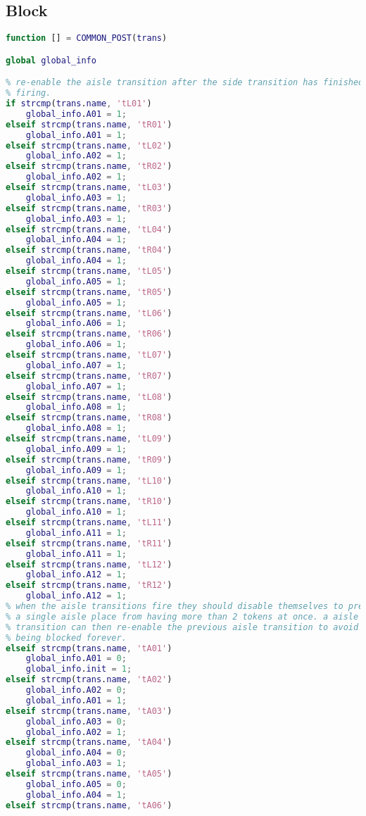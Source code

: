 \subsection{Block}
\begin{lstlisting}[language=MATLAB, caption=COMMON\_POST.m]
function [] = COMMON_POST(trans)

global global_info

% re-enable the aisle transition after the side transition has finished
% firing. 
if strcmp(trans.name, 'tL01')
    global_info.A01 = 1;
elseif strcmp(trans.name, 'tR01')
    global_info.A01 = 1;
elseif strcmp(trans.name, 'tL02')
    global_info.A02 = 1;
elseif strcmp(trans.name, 'tR02')
    global_info.A02 = 1;
elseif strcmp(trans.name, 'tL03')
    global_info.A03 = 1;
elseif strcmp(trans.name, 'tR03')
    global_info.A03 = 1;
elseif strcmp(trans.name, 'tL04')
    global_info.A04 = 1;
elseif strcmp(trans.name, 'tR04')
    global_info.A04 = 1;
elseif strcmp(trans.name, 'tL05')
    global_info.A05 = 1;
elseif strcmp(trans.name, 'tR05')
    global_info.A05 = 1;
elseif strcmp(trans.name, 'tL06')
    global_info.A06 = 1;
elseif strcmp(trans.name, 'tR06')
    global_info.A06 = 1;
elseif strcmp(trans.name, 'tL07')
    global_info.A07 = 1;
elseif strcmp(trans.name, 'tR07')
    global_info.A07 = 1;
elseif strcmp(trans.name, 'tL08')
    global_info.A08 = 1;
elseif strcmp(trans.name, 'tR08')
    global_info.A08 = 1;
elseif strcmp(trans.name, 'tL09')
    global_info.A09 = 1;
elseif strcmp(trans.name, 'tR09')
    global_info.A09 = 1;
elseif strcmp(trans.name, 'tL10')
    global_info.A10 = 1;
elseif strcmp(trans.name, 'tR10')
    global_info.A10 = 1;
elseif strcmp(trans.name, 'tL11')
    global_info.A11 = 1;
elseif strcmp(trans.name, 'tR11')
    global_info.A11 = 1;
elseif strcmp(trans.name, 'tL12')
    global_info.A12 = 1;
elseif strcmp(trans.name, 'tR12')
    global_info.A12 = 1;
% when the aisle transitions fire they should disable themselves to prevent
% a single aisle place from having more than 2 tokens at once. a aisle
% transition can then re-enable the previous aisle transition to avoid it
% being blocked forever.
elseif strcmp(trans.name, 'tA01')
    global_info.A01 = 0;
    global_info.init = 1;
elseif strcmp(trans.name, 'tA02')
    global_info.A02 = 0;
    global_info.A01 = 1;
elseif strcmp(trans.name, 'tA03')
    global_info.A03 = 0;
    global_info.A02 = 1;
elseif strcmp(trans.name, 'tA04')
    global_info.A04 = 0;
    global_info.A03 = 1;
elseif strcmp(trans.name, 'tA05')
    global_info.A05 = 0;
    global_info.A04 = 1;
elseif strcmp(trans.name, 'tA06')

\end{lstlisting}
